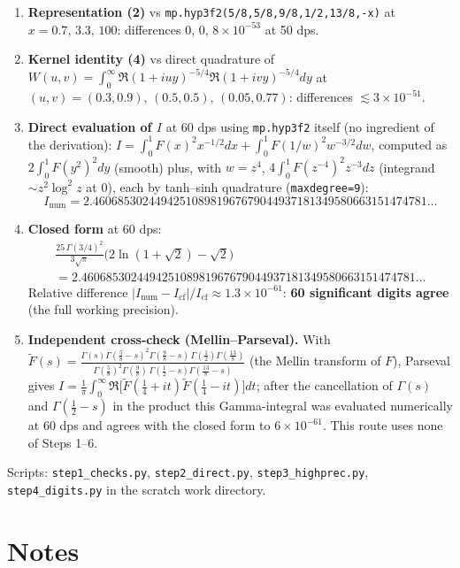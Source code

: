 \documentclass[11pt]{article}
\theoremstyle{remark}
\begin{document}
\begin{enumerate}
\item \textbf{Representation (2)} vs \texttt{mp.hyp3f2(5/8,5/8,9/8,1/2,13/8,-x)} at $x=0.7,\,3.3,\,100$: differences $0$, $0$, $8\times10^{-53}$ at 50 dps.
\item \textbf{Kernel identity (4)} vs direct quadrature of $W(u,v)=\int_0^\infty\Re(1+iuy)^{-5/4}\Re(1+ivy)^{-5/4}dy$ at $(u,v)=(0.3,0.9),\,(0.5,0.5),\,(0.05,0.77)$: differences $\lesssim 3\times10^{-51}$.
\item \textbf{Direct evaluation of $I$} at 60 dps using \texttt{mp.hyp3f2} itself (no ingredient of the derivation):
$I=\int_0^1 F(x)^2x^{-1/2}dx+\int_0^1F(1/w)^2w^{-3/2}dw$, computed as $2\int_0^1F(y^2)^2dy$ (smooth) plus, with $w=z^4$, $4\int_0^1F(z^{-4})^2z^{-3}dz$ (integrand $\sim z^2\log^2z$ at $0$), each by tanh--sinh quadrature (\texttt{maxdegree=9}):
$$I_{\text{num}}=2.460685302449425108981967679044937181349580663151474781\ldots$$
\item \textbf{Closed form} at 60 dps:
\begin{multline*}
\frac{25\,\Gamma(3/4)^2}{3\sqrt\pi}\bigl(2\ln(1+\sqrt2)-\sqrt2\bigr)\\
=2.460685302449425108981967679044937181349580663151474781\ldots
\end{multline*}
Relative difference $|I_{\text{num}}-I_{\text{cf}}|/I_{\text{cf}}\approx1.3\times10^{-61}$: \textbf{60 significant digits agree} (the full working precision).
\item \textbf{Independent cross-check (Mellin--Parseval).} With $\tilde F(s)=\frac{\Gamma(s)\Gamma(\frac58-s)^2\Gamma(\frac98-s)\,\Gamma(\frac12)\Gamma(\frac{13}8)}{\Gamma(\frac58)^2\Gamma(\frac98)\,\Gamma(\frac12-s)\Gamma(\frac{13}8-s)}$ (the Mellin transform of $F$), Parseval gives $I=\frac1\pi\int_0^\infty\Re\bigl[\tilde F(\tfrac14+it)\tilde F(\tfrac14-it)\bigr]dt$; after the cancellation of $\Gamma(s)$ and $\Gamma(\tfrac12-s)$ in the product this Gamma-integral was evaluated numerically at 60 dps and agrees with the closed form to $6\times10^{-61}$. This route uses none of Steps 1--6.
\end{enumerate}

Scripts: \texttt{step1\_checks.py}, \texttt{step2\_direct.py}, \texttt{step3\_highprec.py}, \texttt{step4\_digits.py} in the scratch work directory.

\section*{Notes}
\end{document}
